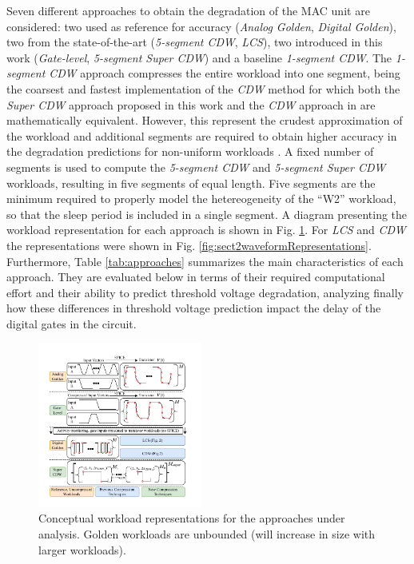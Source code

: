 Seven different approaches to obtain the degradation of the MAC unit are considered: two used as reference for accuracy (\textit{Analog Golden}, \textit{Digital Golden}), two from the state-of-the-art  (\textit{5-segment CDW},  \textit{LCS}), two introduced in this work (\textit{Gate-level}, \textit{5-segment Super CDW}) and a baseline \textit{1-segment CDW}. The \textit{1-segment CDW} approach compresses the entire workload into one segment, being the coarsest and fastest implementation of the \textit{CDW} method for which both the \textit{Super CDW} approach proposed in this work and the \textit{CDW} approach in \cite{AtomisticPseudoRodopoulos2014} are mathematically equivalent. However, this represent the crudest approximation of the workload and additional segments are required to obtain higher accuracy in the degradation predictions for non-uniform workloads \cite{AtomisticPseudoRodopoulos2014}. A fixed number of segments is used to compute the \textit{5-segment CDW} and \textit{5-segment Super CDW} workloads, resulting in five segments of equal length. Five segments are the minimum required to properly model the hetereogeneity of the ``W2'' workload, so that the sleep period is included in a single segment. A diagram presenting the workload representation for each approach is shown in Fig. \ref{fig:sect4waveformRepresentations}. For \textit{LCS} and \textit{CDW} the representations were shown in Fig. \ref{fig:sect2waveformRepresentations}. Furthermore, Table \ref{tab:approaches} summarizes the main characteristics of each approach. They are evaluated below in terms of their required computational effort and their ability to predict threshold voltage degradation, analyzing finally how these differences in threshold voltage prediction impact the delay of the digital gates in the circuit.
\begin{figure}[!t]
    
    \includegraphics[width=0.48\textwidth,trim={7.5mm 6mm 10mm 8mm},clip]{images/ch2/WaveformRepresentationsSect4.pdf}
    \caption{Conceptual workload representations for the approaches under analysis. Golden workloads are unbounded (will increase in size with larger workloads). }
    \label{fig:sect4waveformRepresentations}
\end{figure}

